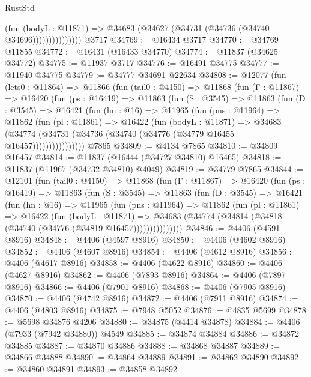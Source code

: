 \begin{lexlean}{RustStd}
\begin{coremodule}
                        (fun (bodyL : @11871) =>
                        @34683 (@34627 (@34731 (@34736 (@34740 @34696)))))))))))))))
    @3717
@34769 := @16434 @3717
@34770 := @34769 @11855
@34772 := @16431 (@16433 @34770)
@34774 := @11837 (@34625 @34772)
@34775 := @11937 @3717
@34776 := @16491 @34775
@34777 := @11940 @34775
@34779 := @34777 @34691 @22634
@34808 := @12077
    (fun (lets0 : @11864) =>
    @11866
      (fun (tail0 : @4150) =>
      @11868
        (fun (Γ : @11867) =>
        @16420
          (fun (ps : @16419) =>
          @11863
            (fun (S : @3545) =>
            @11863
              (fun (D : @3545) =>
              @16421
                (fun (hn : @16) =>
                @11965
                  (fun (pns : @11964) =>
                  @11862
                    (fun (pl : @11861) =>
                    @16422
                      (fun (bodyL : @11871) =>
                      @34683
                        (@34774
                          (@34731 (@34736 (@34740 (@34776 (@34779 @16455 @16457))))))))))))))))
    @7865
@34809 := @4134 @7865
@34810 := @34809 @16457
@34814 := @11837 (@16444 (@34727 @34810) @16465)
@34818 := @11837 (@11967 (@34732 @34810) @4049)
@34819 := @34779 @7865
@34844 := @12101
    (fun (tail0 : @4150) =>
    @11868
      (fun (Γ : @11867) =>
      @16420
        (fun (ps : @16419) =>
        @11863
          (fun (S : @3545) =>
          @11863
            (fun (D : @3545) =>
            @16421
              (fun (hn : @16) =>
              @11965
                (fun (pns : @11964) =>
                @11862
                  (fun (pl : @11861) =>
                  @16422
                    (fun (bodyL : @11871) =>
                    @34683 (@34774 (@34814 (@34818 (@34740 (@34776 (@34819 @16457)))))))))))))))
@34846 := @4406 (@4591 @8916)
@34848 := @4406 (@4597 @8916)
@34850 := @4406 (@4602 @8916)
@34852 := @4406 (@4607 @8916)
@34854 := @4406 (@4612 @8916)
@34856 := @4406 (@4617 @8916)
@34858 := @4406 (@4622 @8916)
@34860 := @4406 (@4627 @8916)
@34862 := @4406 (@7893 @8916)
@34864 := @4406 (@7897 @8916)
@34866 := @4406 (@7901 @8916)
@34868 := @4406 (@7905 @8916)
@34870 := @4406 (@4742 @8916)
@34872 := @4406 (@7911 @8916)
@34874 := @4406 (@4803 @8916)
@34875 := @7948 @5052
@34876 := @4835 @5699
@34878 := @5698 @34876 @4206
@34880 := @34875 (@4414 @34878)
@34884 := @4406 (@7933 (@7942 @34880)) @4549
@34885 := @34874 @34884
@34886 := @34872 @34885
@34887 := @34870 @34886
@34888 := @34868 @34887
@34889 := @34866 @34888
@34890 := @34864 @34889
@34891 := @34862 @34890
@34892 := @34860 @34891
@34893 := @34858 @34892

\end{coremodule}
\end{lexlean}
